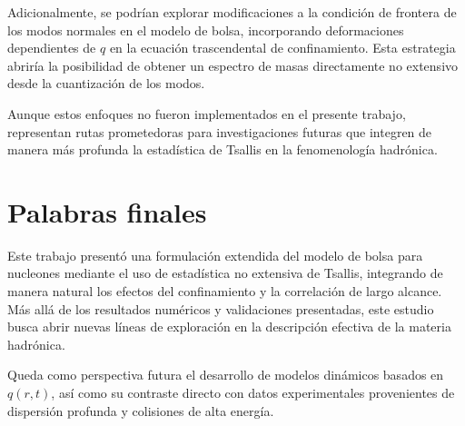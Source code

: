 Adicionalmente, se podrían explorar modificaciones a la condición de frontera de los modos normales en el modelo de bolsa, incorporando deformaciones dependientes de \( q \) en la ecuación trascendental de confinamiento. Esta estrategia abriría la posibilidad de obtener un espectro de masas directamente no extensivo desde la cuantización de los modos.

Aunque estos enfoques no fueron implementados en el presente trabajo, representan rutas prometedoras para investigaciones futuras que integren de manera más profunda la estadística de Tsallis en la fenomenología hadrónica.

\section*{Palabras finales}

Este trabajo presentó una formulación extendida del modelo de bolsa para nucleones mediante el uso de estadística no extensiva de Tsallis, integrando de manera natural los efectos del confinamiento y la correlación de largo alcance. Más allá de los resultados numéricos y validaciones presentadas, este estudio busca abrir nuevas líneas de exploración en la descripción efectiva de la materia hadrónica. 

Queda como perspectiva futura el desarrollo de modelos dinámicos basados en \( q(r,t) \), así como su contraste directo con datos experimentales provenientes de dispersión profunda y colisiones de alta energía.






